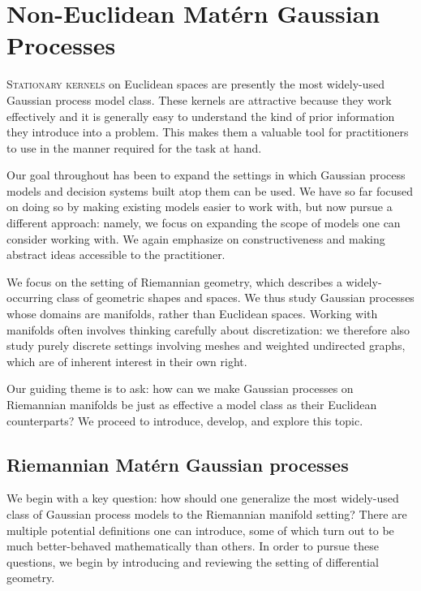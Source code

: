 \documentclass[11pt]{book}
\begin{document}
\chapter{Non-Euclidean Matérn Gaussian Processes}
\label{ch:noneuclidean}

\lettrine{S}{tationary kernels} on Euclidean spaces are presently the most widely-used Gaussian process model class.
These kernels are attractive because they work effectively and it is generally easy to understand the kind of prior information they introduce into a problem.
This makes them a valuable tool for practitioners to use in the manner required for the task at hand.

Our goal throughout has been to expand the settings in which Gaussian process models and decision systems built atop them can be used.
We have so far focused on doing so by making existing models easier to work with, but now pursue a different approach: namely, we focus on expanding the scope of models one can consider working with.
We again emphasize on constructiveness and making abstract ideas accessible to the practitioner.

We focus on the setting of Riemannian geometry, which describes a widely-occurring class of geometric shapes and spaces.
We thus study Gaussian processes whose domains are manifolds, rather than Euclidean spaces.
Working with manifolds often involves thinking carefully about discretization: we therefore also study purely discrete settings involving meshes and weighted undirected graphs, which are of inherent interest in their own right.

Our guiding theme is to ask: how can we make Gaussian processes on Riemannian manifolds be just as effective a model class as their Euclidean counterparts?
We proceed to introduce, develop, and explore this topic.


\section{Riemannian Matérn Gaussian processes}

We begin with a key question: how should one generalize the most widely-used class of Gaussian process models to the Riemannian manifold setting?
There are multiple potential definitions one can introduce, some of which turn out to be much better-behaved mathematically than others.
In order to pursue these questions, we begin by introducing and reviewing the setting of differential geometry.
\end{document}

